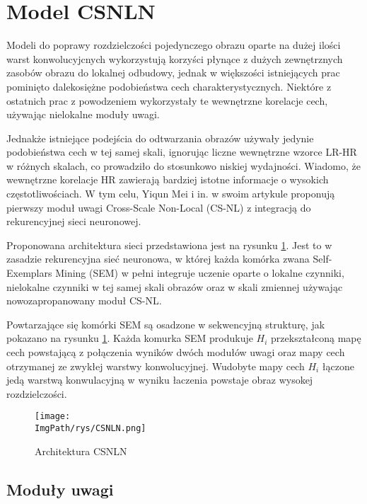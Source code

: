 \documentclass[a4paper,12pt,twoside,openany]{report}
\newcommand{\ImgPath}{.}
\begin{document}
\section{Model CSNLN}
	
	Modeli do  poprawy rozdzielczości pojedynczego obrazu oparte na dużej ilości warst konwolucyjcnych wykorzystują korzyści płynące z dużych zewnętrznych zasobów obrazu do lokalnej odbudowy, jednak w większości istniejących prac pominięto dalekosiężne podobieństwa cech charakterystycznych. Niektóre z ostatnich prac z powodzeniem wykorzystały te wewnętrzne korelacje cech, używając nielokalne moduły uwagi.
	
	Jednakże istniejące podejścia do odtwarzania obrazów używały jedynie podobieństwa cech w tej samej skali, ignorując liczne wewnętrzne wzorce LR-HR w różnych skalach, co prowadziło do stosunkowo niskiej wydajności. Wiadomo, że wewnętrzne korelacje HR zawierają bardziej istotne informacje o wysokich częstotliwościach. W tym celu,  Yiqun Mei i in. w swoim artykule proponują pierwszy moduł uwagi Cross-Scale Non-Local (CS-NL) z integracją do rekurencyjnej sieci neuronowej. 
	
	Proponowana architektura sieci przedstawiona jest na rysunku \ref{CSNLN}. Jest to w zasadzie rekurencyjna sieć neuronowa, w której każda komórka zwana Self-Exemplars Mining (SEM) w pełni integruje uczenie oparte o lokalne czynniki, nielokalne czynniki w tej samej skali obrazów oraz w skali zmiennej używając nowozapropanowany moduł CS-NL. 
	
	Powtarzające się komórki SEM są osadzone w sekwencyjną strukturę, jak pokazano na rysunku \ref{CSNLN}. Każda komurka SEM produkuje $H_i$ przekształconą mapę cech powstającą z połączenia wyników dwóch modułów uwagi oraz mapy cech otrzymanej ze zwykłej warstwy konwolucyjnej. Wudobyte mapy cech $H_i$ łączone jedą warstwą konwulacyjną w wyniku łaczenia powstaje obraz wysokej rozdzielczości.
	
	\begin{figure}[!htbp]
		\begin{center}
			\centering
			\texttt{[image: \\ImgPath/rys/CSNLN.png]}
		\end{center}
		\caption{Architektura CSNLN}
		\label{CSNLN}
	\end{figure}
	\subsection{Moduły uwagi}
	
\end{document}
